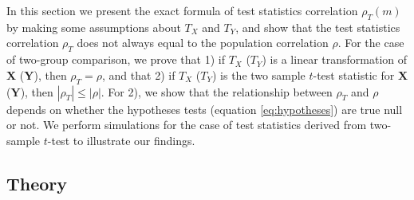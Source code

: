 \documentclass[12pt, a4paper]{article}
\begin{document}
	In this section we present the exact formula of test statistics correlation $\rho_T(m)$ by 
	making some assumptions about $T_X$ and $T_Y$, and show that the test statistics correlation 
	$\rho_T$ does not always equal to the population correlation $\rho$. For the case of two-group 
	comparison, we prove that 1) if $T_X$ ($T_Y$) is a linear transformation of $\bm X$ ($\bm Y$), 
	then $\rho_T= \rho$, and that 2) if $T_X$ ($T_Y$) is the two sample $t$-test statistic for $\bm 
	X$ ($\bm Y$), then $|\rho_T| \leq |\rho|$. For 2), we show that the relationship between 
	$\rho_T$ and $\rho$ depends on whether the hypotheses tests (equation \ref{eq:hypotheses}) are 
	true null or not. We perform simulations for the case of test statistics derived from 
	two-sample $t$-test to illustrate our findings.
	
	\subsection{Theory}
	
\end{document}
